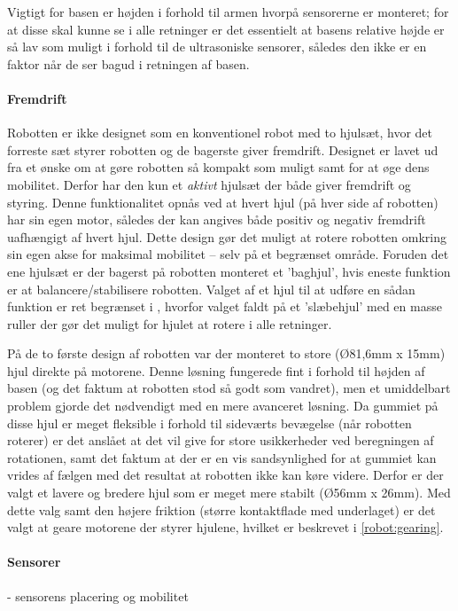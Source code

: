 Vigtigt for basen er højden i forhold til armen hvorpå sensorerne er monteret; for at disse skal kunne se i alle retninger er det essentielt at basens relative højde er så lav som muligt i forhold til de ultrasoniske sensorer, således den ikke er en faktor når de ser bagud i retningen af basen. 

\paragraph{Fremdrift}
Robotten er ikke designet som en konventionel robot med to hjulsæt, hvor det forreste sæt styrer robotten og de bagerste giver fremdrift.
Designet er lavet ud fra et ønske om at gøre robotten så kompakt som muligt samt for at øge dens mobilitet.
Derfor har den kun et \textit{aktivt} hjulsæt der både giver fremdrift og styring.
Denne funktionalitet opnås ved at hvert hjul (på hver side af robotten) har sin egen motor, således der kan angives både positiv og negativ fremdrift uafhængigt af hvert hjul.
Dette design gør det muligt at rotere robotten omkring sin egen akse for maksimal mobilitet -- selv på et begrænset område.
Foruden det ene hjulsæt er der bagerst på robotten monteret et 'baghjul', hvis eneste funktion er at balancere/stabilisere robotten.
Valget af et hjul til at udføre en sådan funktion er ret begrænset i \lego, hvorfor valget faldt på et 'slæbehjul' med en masse ruller der gør det muligt for hjulet at rotere i alle retninger.

På de to første design af robotten var der monteret to store (Ø81,6mm x 15mm) hjul direkte på motorene.
Denne løsning fungerede fint i forhold til højden af basen (og det faktum at robotten stod så godt som vandret), men et umiddelbart problem gjorde det nødvendigt med en mere avanceret løsning. 
Da gummiet på disse hjul er meget fleksible i forhold til sideværts bevægelse (når robotten roterer) er det anslået at det vil give for store usikkerheder ved beregningen af rotationen, samt det faktum at der er en vis sandsynlighed for at gummiet kan vrides af fælgen med det resultat at robotten ikke kan køre videre.
Derfor er der valgt et lavere og bredere hjul som er meget mere stabilt (Ø56mm x 26mm).
Med dette valg samt den højere friktion (større kontaktflade med underlaget) er det valgt at geare motorene der styrer hjulene, hvilket er beskrevet i \cref{robot:gearing}.

\paragraph{Sensorer}
- sensorens placering og mobilitet











